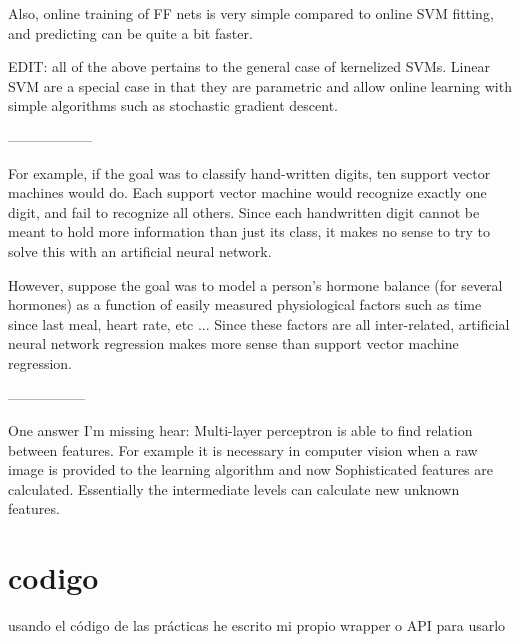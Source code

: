 \documentclass[titlepage]{article}
\begin{document}
\begin{multicols*}{2}
Also, online training of FF nets is very simple compared to online SVM fitting, and predicting can be quite a bit faster.

EDIT: all of the above pertains to the general case of kernelized SVMs. Linear SVM are a special case in that they are parametric and allow online learning with simple algorithms such as stochastic gradient descent.

------------------

For example, if the goal was to classify hand-written digits, ten support vector machines would do. Each support vector machine would recognize exactly one digit, and fail to recognize all others. Since each handwritten digit cannot be meant to hold more information than just its class, it makes no sense to try to solve this with an artificial neural network.

However, suppose the goal was to model a person's hormone balance (for several hormones) as a function of easily measured physiological factors such as time since last meal, heart rate, etc ... Since these factors are all inter-related, artificial neural network regression makes more sense than support vector machine regression.

-----------------

One answer I'm missing hear: Multi-layer perceptron is able to find relation between features. For example it is necessary in computer vision when a raw image is provided to the learning algorithm and now Sophisticated features are calculated. Essentially the intermediate levels can calculate new unknown features.

\end{multicols*}

\section{codigo}
usando el código de las prácticas he escrito mi propio wrapper o API para usarlo

\lstlistoflistings
\end{document}
